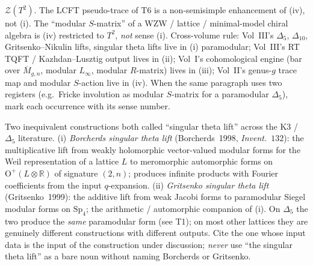 \begin{description}[itemsep=4pt, leftmargin=2.0em, style=nextline]
$\mathcal Z(T^2)$. The LCFT pseudo-trace of T6
is a non-semisimple enhancement of (iv), not (i). The ``modular
$S$-matrix'' of a WZW / lattice / minimal-model chiral algebra is (iv)
restricted to $T^2$, \emph{not} sense (i).
Cross-volume rule: Vol~III's $\Delta_5$, $\Delta_{10}$, Gritsenko--Nikulin
lifts, singular theta lifts live in (i) paramodular; Vol~III's RT TQFT /
Kazhdan--Lusztig output lives in (ii); Vol~I's cohomological engine
(bar over $\overline{M}_{g,n}$, modular $L_\infty$, modular $R$-matrix)
lives in (iii); Vol~II's genus-$g$ trace map and modular $S$-action
live in (iv). When the same paragraph uses two registers (e.g.\ Fricke
involution as modular $S$-matrix for a paramodular $\Delta_5$), mark
each occurrence with its sense number.

\item[T16 (``singular theta lift''--Borcherds vs Gritsenko).]
%
Two inequivalent constructions both called ``singular theta lift''
across the K3 / $\Delta_5$ literature.
(i) \emph{Borcherds singular theta lift}
(Borcherds~1998, \emph{Invent.}~$132$): the multiplicative lift from
weakly holomorphic vector-valued modular forms for the Weil
representation of a lattice $L$ to meromorphic automorphic forms on
$\mathrm{O}^+(L \otimes \mathbb R)$ of signature $(2, n)$; produces
infinite products with Fourier coefficients from the input
$q$-expansion.
(ii) \emph{Gritsenko singular theta lift} (Gritsenko~1999):
the additive lift from weak Jacobi forms to paramodular Siegel
modular forms on $\mathrm{Sp}_4$; the arithmetic / automorphic
companion of (i).
On $\Delta_5$ the two produce the \emph{same} paramodular form
(see T1); on most other lattices they are genuinely different
constructions with different outputs. Cite the one whose input
data is the input of the construction under discussion; \emph{never}
use ``the singular theta lift'' as a bare noun without naming
Borcherds or Gritsenko.


\end{description}
